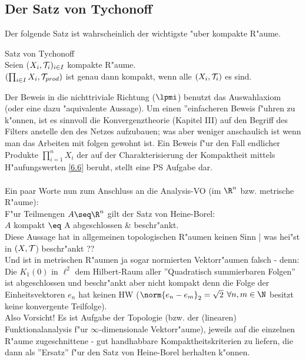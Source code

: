 \subsection{Der Satz von {\sc Tychonoff}}
Der folgende Satz ist wahrscheinlich der wichtigste "uber kompakte R"aume.
\begin{satz}\label{6.14}{\sc Satz von Tychonoff}\\
Seien ($X_i,\mathcal T_i)_{i\in I}$ kompakte R"aume.\\
$(\prod_{i\in I}X_i,\mathcal T_{prod})$ ist genau dann kompakt, wenn alle $(X_i,\mathcal T_i)$ es sind.
\end{satz}
Der Beweis in die nichttriviale Richtung ($\lpmi$) benutzt das Auswahlaxiom (oder eine dazu "aquivalente Aussage). Um einen ''einfacheren Beweis f"uhren zu k"onnen, ist es sinnvoll die Konvergenztheorie (Kapitel III) auf den Begriff des Filters anstelle den des Netzes aufzubauen; was aber weniger anschaulich ist wenn man das Arbeiten mit folgen gewohnt ist. Ein Beweis f"ur den Fall endlicher Produkte $\prod_{i=1}^nX_i$ der auf der Charakterisierung der Kompaktheit mittels H"aufungswerten \ref{6.6} beruht, stellt eine PS Aufgabe dar.\\
\\
Ein paar Worte nun zum Anschluss an die Analysis-VO (im $\R^n$ bzw. metrische R"aume):\\
F"ur Teilmengen $ A\seq \R^n$ gilt der Satz von {\sc Heine-Borel}:\\
$A$ kompakt $\eq$ A abgeschlossen \& beschr"ankt.\\
Diese Aussage hat in allgemeinen topologischen R"aumen keinen Sinn | was hei"st in $(X,\mathcal T$) beschr"ankt ??\\
Und ist in metrischen R"aumen ja sogar normierten Vektorr"aumen falsch - denn:\\
Die $K_1(0)$ in $\ell^2$ dem {\sc Hilbert}-Raum aller ''Quadratisch summierbaren Folgen'' ist abgeschlossen und beschr"ankt aber {\sc nicht} kompakt denn die Folge der Einheitsvektoren $e_n$ hat {\sc keinen} HW ($\norm{e_n -e_m}_2=\sqrt{2}$ $\forall n,m\in \N$ besitzt keine konvergente Teilfolge).\\
Also {\sc Vorsicht!} Es ist Aufgabe der Topologie (bzw. der (linearen) Funktionalanalysis f"ur $\infty$-dimensionale Vektorr"aume), jeweils auf die einzelnen R"aume zugeschnittene - gut handhabbare Kompaktheitskriterien zu liefern, die dann als ''Ersatz'' f"ur den Satz von {\sc Heine-Borel} herhalten k"onnen.\\
